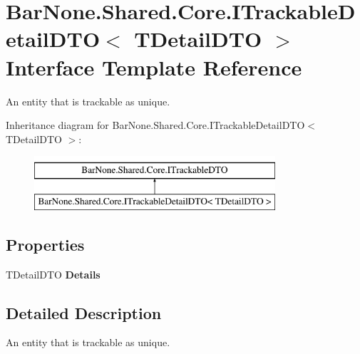 \hypertarget{interface_bar_none_1_1_shared_1_1_core_1_1_i_trackable_detail_d_t_o}{}\section{Bar\+None.\+Shared.\+Core.\+I\+Trackable\+Detail\+D\+TO$<$ T\+Detail\+D\+TO $>$ Interface Template Reference}
\label{interface_bar_none_1_1_shared_1_1_core_1_1_i_trackable_detail_d_t_o}


An entity that is trackable as unique.  


Inheritance diagram for Bar\+None.\+Shared.\+Core.\+I\+Trackable\+Detail\+D\+TO$<$ T\+Detail\+D\+TO $>$\+:\begin{figure}[H]
\begin{center}
\leavevmode
\includegraphics[height=2.000000cm]{interface_bar_none_1_1_shared_1_1_core_1_1_i_trackable_detail_d_t_o}
\end{center}
\end{figure}
\subsection*{Properties}
\begin{DoxyCompactItemize}
\item 
\mbox{\label{interface_bar_none_1_1_shared_1_1_core_1_1_i_trackable_detail_d_t_o_aa3851f92fbe32351cf72462b7bd878ac}} 
T\+Detail\+D\+TO {\bfseries Details}
\end{DoxyCompactItemize}


\subsection{Detailed Description}
An entity that is trackable as unique. 


